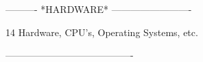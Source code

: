  
 
 
 
 
 
 
 
 
 
 
 
 
 
 
 
 
 
 
 
 
 
 
 
 
 
 
 
 
 
 
 
 
 
 
 
 
 
 
 
 
 
 
 
 
 
 
 
 
 
 
 
 
 
 
 
 
 
 
 
 
 
 
 
 
 
 
 
 
 
 
 
 
 
 
 
 
 
 
 
 
 
 
----------  *HARDWARE*  -------------------------
 
14
Hardware, CPU's, Operating Systems, etc.
 
----------------------------------------
 
 
 
 
 
 
 
 
 
 
 
 
 
 
 
 
 
 
 
 
 
 
 
 
 
 
 
